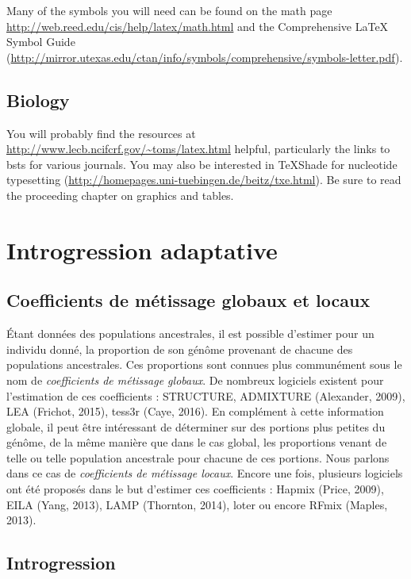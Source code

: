 \documentclass[12pt,twoside]{reedthesis}
\theoremstyle{definition}
\theoremstyle{definition}
\theoremstyle{remark}
\begin{document}
  Many of the symbols you will need can be found on the math page
  \url{http://web.reed.edu/cis/help/latex/math.html} and the Comprehensive
  LaTeX Symbol Guide
  (\url{http://mirror.utexas.edu/ctan/info/symbols/comprehensive/symbols-letter.pdf}).
  
  \section{Biology}\label{biology}
  
  You will probably find the resources at
  \url{http://www.lecb.ncifcrf.gov/~toms/latex.html} helpful, particularly
  the links to bsts for various journals. You may also be interested in
  TeXShade for nucleotide typesetting
  (\url{http://homepages.uni-tuebingen.de/beitz/txe.html}). Be sure to
  read the proceeding chapter on graphics and tables.
  
  \chapter{Introgression adaptative}\label{introgression-adaptative}
  
  \section{Coefficients de métissage globaux et
  locaux}\label{coefficients-de-metissage-globaux-et-locaux}
  
  Étant données des populations ancestrales, il est possible d'estimer
  pour un individu donné, la proportion de son génôme provenant de chacune
  des populations ancestrales. Ces proportions sont connues plus
  communément sous le nom de \emph{coefficients de métissage globaux}. De
  nombreux logiciels existent pour l'estimation de ces coefficients :
  STRUCTURE, ADMIXTURE (Alexander, 2009), LEA (Frichot, 2015), tess3r
  (Caye, 2016). En complément à cette information globale, il peut être
  intéressant de déterminer sur des portions plus petites du génôme, de la
  même manière que dans le cas global, les proportions venant de telle ou
  telle population ancestrale pour chacune de ces portions. Nous parlons
  dans ce cas de \emph{coefficients de métissage locaux}. Encore une fois,
  plusieurs logiciels ont été proposés dans le but d'estimer ces
  coefficients : Hapmix (Price, 2009), EILA (Yang, 2013), LAMP (Thornton,
  2014), loter ou encore RFmix (Maples, 2013).
  
  \section{Introgression}\label{introgression}
  
\end{document}
